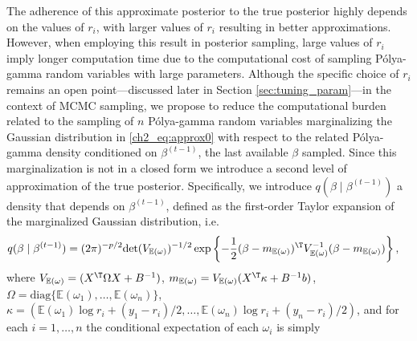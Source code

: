 The adherence of this approximate posterior to the true posterior highly depends on the values of $r_i$, with larger values of $r_i$ resulting in better approximations. However, when employing this result in posterior sampling, large values of $r_i$ imply longer computation time due to the computational cost of sampling P\'olya-gamma random variables with large parameters. Although the specific choice of $r_i$ remains an open point---discussed later in Section \ref{sec:tuning_param}---in the context of MCMC sampling, we propose to reduce the computational burden related to the sampling of $n$  P\'olya-gamma  random variables marginalizing the Gaussian distribution in \eqref{ch2_eq:approx0} with respect to the related P\'olya-gamma density conditioned on $\beta^{(t-1)}$,  the last available $\beta$ sampled. Since this marginalization is not in a closed form we introduce a second level of approximation of the true posterior. Specifically, we introduce $q(\beta \mid \beta^{(t-1)})$ a density that depends on $\beta^{(t-1)}$, defined as the first-order Taylor expansion of the marginalized Gaussian distribution, i.e. 
\begin{equation}
\begin{aligned}
q(\beta\mid \beta^{(t-1)}) & = %
(2\pi)^{-p/2} \mathrm{det}(V_{\mathbb{E}(\omega)})^{-1/2} \exp\left\{-\frac{1}{2}(\beta - m_{\mathbb{E}(\omega)})^\T V_{\mathbb{E}(\omega)}^{-1} (\beta - m_{\mathbb{E}(\omega)})\right\},
\end{aligned}
\label{ch2_eq:approx2}
\end{equation}
where $V_{\mathbb{E}(\omega)} = (X^\T \Omega X + B^{-1})$, $m_{\mathbb{E}(\omega)} = V_{\mathbb{E}(\omega)}(X^\T \kappa + B^{-1}b)$, 
$\Omega = \mathrm{diag} \{ \mathbb{E}(\omega_1),\dots,\mathbb{E}(\omega_n)\}$, $\kappa = (\mathbb{E}(\omega_1) \log r_i + (y_1-r_i)/2, \dots, \mathbb{E}(\omega_n) \log r_i + (y_n-r_i)/2)$, and for each $i = 1, \dots, n$ the conditional expectation of each $\omega_i$ is simply 
